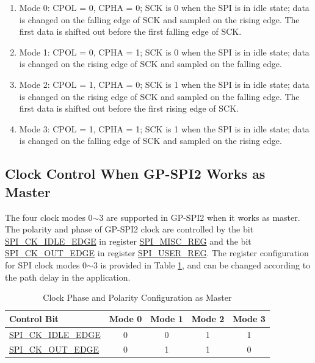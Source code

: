 \documentclass[main\_\_EN.tex]{subfiles}
\begin{document}
\begin{enumerate}
    \item Mode 0: CPOL = 0, CPHA = 0; SCK is 0 when the SPI is in idle state; data is changed on the falling edge of SCK and sampled on the rising edge. The first data is shifted out before the first falling edge of SCK.
    \item Mode 1: CPOL = 0, CPHA = 1; SCK is 0 when the SPI is in idle state; data is changed on the rising edge of SCK and sampled on the falling edge.   
    \item Mode 2: CPOL = 1, CPHA = 0; SCK is 1 when the SPI is in idle state; data is changed on the rising edge of SCK and sampled on the falling edge. The first data is shifted out before the first rising edge of SCK.
    \item Mode 3: CPOL = 1, CPHA = 1; SCK is 1 when the SPI is in idle state; data is changed on the falling edge of SCK and sampled on the rising edge. 
\end{enumerate}


\subsection{Clock Control When GP-SPI2 Works as Master}\label{sec:gp-spi2-master-clock-control}

The four clock modes 0$\sim$3 are supported in GP-SPI2 when it works as master. The polarity and phase of GP-SPI2 clock are controlled by the bit \hyperref[fielddesc:SPICKIDLEEDGE]{SPI\_CK\_IDLE\_EDGE} in register \hyperref[regdesc:SPIMISCREG]{SPI\_MISC\_REG} and the bit \hyperref[fielddesc:SPICKOUTEDGE]{SPI\_CK\_OUT\_EDGE} in register \hyperref[regdesc:SPIUSERREG]{SPI\_USER\_REG}. The register configuration for SPI clock modes 0$\sim$3 is provided in Table \ref{tab:clock-pol-master}, and can be changed according to the path delay in the application.

\begin{table}[H]
    \centering
    \caption{Clock Phase and Polarity Configuration as Master}
    \label{tab:clock-pol-master}
    \begin{tabular}[c]{|p{3.5cm}|c|c|c|c|}
    \hline
    \rowcolor{lightgray}
    \textbf{Control Bit} & \textbf{Mode 0} & \textbf{Mode 1} & \textbf{Mode 2} & \textbf{Mode 3}\\
    \hline
   \hyperref[fielddesc:SPICKIDLEEDGE]{SPI\_CK\_IDLE\_EDGE}  & 0     & 0     & 1     & 1\\
    \hline
   \hyperref[fielddesc:SPICKOUTEDGE]{SPI\_CK\_OUT\_EDGE}   & 0     & 1     & 1     & 0\\
    \hline
    \end{tabular}
\end{table}
\end{document}

